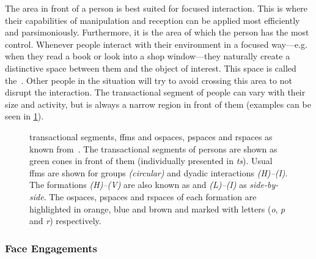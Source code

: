 The area in front of a person is best suited for \gls{focused interaction}.
This is where their capabilities of manipulation and reception can be applied most efficiently and parsimoniously.
Furthermore, it is the area of which the person has the most control.
Whenever people interact with their environment in a focused way---e.g. when they read a book or look into a shop window---they naturally create a distinctive space between them and the object of interest.
This space is called the~\cite[p. 240]{Ciolek1980}.
Other people in the situation will try to avoid crossing this area to not disrupt the interaction.
The \gls{transactional segment} of people can vary with their size and activity, but is always a narrow region in front of them (examples can be seen in \cref{fig:rw.ffm}).
\begin{figure}[htb]
    \centering
    \def\svgwidth{1.0\textwidth}
    
    \caption[F-Formations in focused interactions.]{\label{fig:rw.ffm} 
    \Glspl{transactional segment}, \glspl{ffm} and \glspl{ospace}, \glspl{pspace} and \glspl{rspace} as known from~.
    The \glspl{transactional segment} of persons are shown as green cones in front of them (individually presented in \emph{ts}).
    Usual \glspl{ffm} are shown for groups \emph{(circular)} and dyadic interactions \emph{(H)--(I)}.
    The formations \emph{(H)--(V)} are also known as \emph{\visavis} and \emph{(L)--(I)} as \emph{side-by-side}.
    The \glspl{ospace}, \glspl{pspace} and \glspl{rspace} of each formation are highlighted in orange, blue and brown and marked with letters (\emph{o}, \emph{p} and \emph{r}) respectively.
    }
\end{figure}

\subsubsection{Face Engagements}\label{sec.rw.hi.faceengagements}

